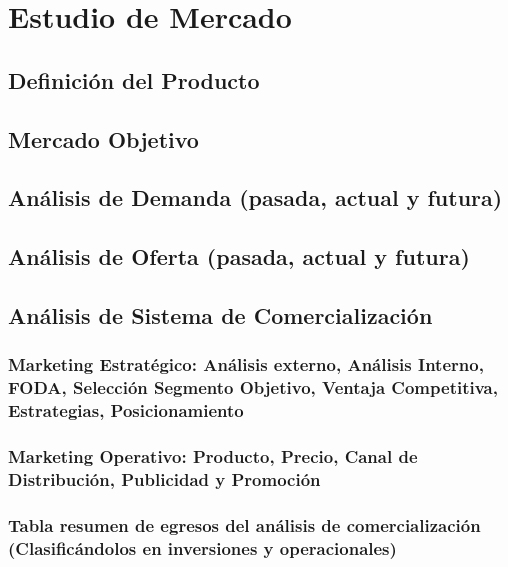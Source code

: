 \section{Estudio de Mercado}
	\subsection{Definición del Producto}
	\subsection{Mercado Objetivo}
	\subsection{Análisis de Demanda (pasada, actual y futura)}
	\subsection{Análisis de Oferta (pasada, actual y futura)}
	\subsection{Análisis de Sistema de Comercialización}
		\subsubsection{Marketing Estratégico: Análisis externo, Análisis Interno, FODA, Selección Segmento Objetivo, Ventaja Competitiva, Estrategias, Posicionamiento} 	
		\subsubsection{Marketing Operativo: Producto, Precio, Canal de Distribución, Publicidad y Promoción}
		\subsubsection{Tabla resumen de egresos del análisis de comercialización (Clasificándolos en inversiones y operacionales)}
